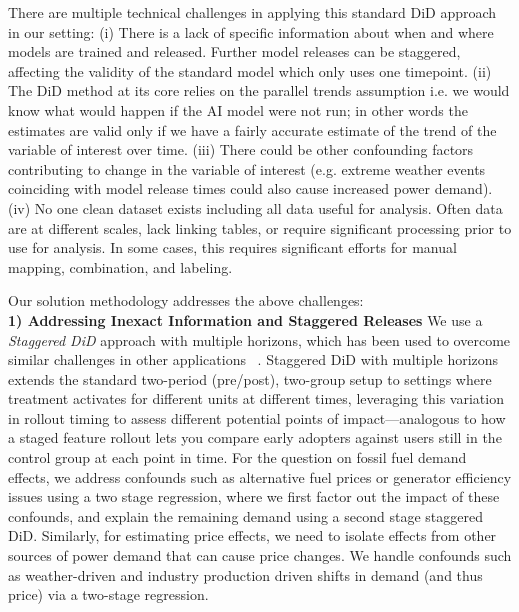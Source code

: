 \documentclass[sigconf,authordraft]{acmart}
\newcommand{\nb}[1]{\textcolor{blue}{NB[#1]}}
\newcommand{\aruna}[1]{\textcolor{blue}{Aruna[#1]}}
\begin{document}
There are multiple technical challenges in applying this standard DiD approach in our setting: (i) There is a lack of specific information about when and where models are trained and released. Further model releases can be staggered, affecting the validity of the standard model which only uses one timepoint. (ii) The DiD method at its core relies on the parallel trends assumption i.e. we would know what would happen if the AI model were not run; in other words the estimates are valid only if we have a fairly accurate estimate of the trend of the variable of interest over time. (iii) There could be other confounding factors contributing to change in the variable of interest (e.g. extreme weather events coinciding with model release times could also cause increased power demand). (iv) No one clean dataset exists including all data useful for analysis. Often data are at different scales, lack linking tables, or require significant processing prior to use for analysis. In some cases, this requires significant efforts for manual mapping, combination, and labeling.

Our solution methodology addresses the above challenges:\\
\noindent \textbf{1) Addressing Inexact Information and Staggered Releases} %
We use a \textit{Staggered DiD} approach with multiple horizons, which has been used to overcome similar challenges in other applications ~\cite{cengiz2019effect, deshpande2019screened}. Staggered DiD with multiple horizons extends the standard two-period (pre/post), two-group setup to settings where treatment activates for different units at different times, leveraging this variation in rollout timing to assess different potential points of impact—analogous to how a staged feature rollout lets you compare early adopters against users still in the control group at each point in time.
For the question on fossil fuel demand effects, we address confounds such as alternative fuel prices or generator efficiency issues using a two stage regression, where we first factor out the impact of these confounds, and explain the remaining demand using a second stage staggered DiD. Similarly, for estimating price effects, we need to isolate effects from other sources of power demand that can cause price changes.
We handle confounds such as weather-driven and industry production driven shifts in demand (and thus price) via a two-stage regression. 
\end{document}
